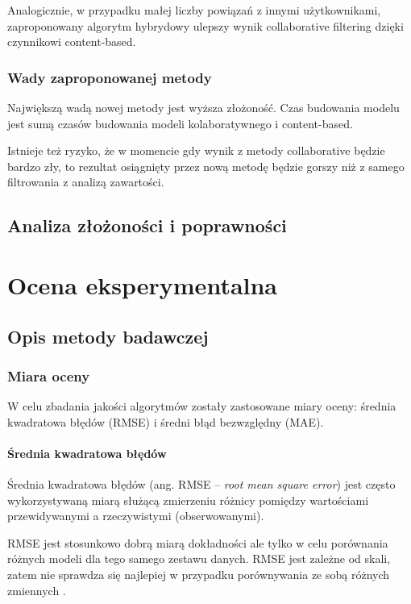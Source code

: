 \documentclass[twoside]{iisthesis}
\begin{document}
		 Analogicznie, w przypadku małej liczby powiązań z innymi użytkownikami, zaproponowany algorytm hybrydowy ulepszy wynik collaborative filtering dzięki czynnikowi content-based. 
		 
		 \subsection{Wady zaproponowanej metody}
		 
		 Największą wadą nowej metody jest wyższa złożoność. Czas budowania modelu jest sumą czasów budowania modeli kolaboratywnego i content-based. 
		 
		 Istnieje też ryzyko, że w momencie gdy wynik z metody collaborative będzie bardzo zły, to rezultat osiągnięty przez nową metodę będzie gorszy niż z samego filtrowania z analizą zawartości. 
	 
	 \section{Analiza złożoności i poprawności}
 
 
\chapter{Ocena eksperymentalna}
	\section{Opis metody badawczej}
	
		\subsection{Miara oceny}
	
		W celu zbadania jakości algorytmów zostały zastosowane miary oceny: średnia kwadratowa błędów (RMSE) i średni błąd bezwzględny (MAE).
		
		\subsubsection{Średnia kwadratowa błędów}
	
		Średnia kwadratowa błędów (ang. RMSE -- \textit{root mean square error}) jest często wykorzystywaną miarą służącą zmierzeniu różnicy pomiędzy wartościami przewidywanymi a rzeczywistymi (obserwowanymi). 
		
		RMSE jest stosunkowo dobrą miarą dokładności ale tylko w celu porównania  różnych modeli dla tego samego zestawu danych. RMSE jest zależne od skali, zatem nie sprawdza się najlepiej w przypadku porównywania ze sobą różnych zmiennych \cite{hyndman2006another}.
		
\end{document}

